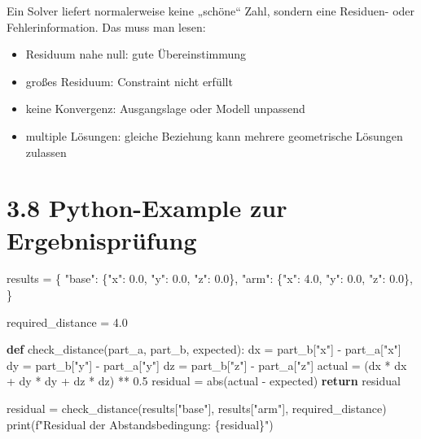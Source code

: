 \documentclass[
  12pt
]{book}
\newenvironment{Shaded}{}{}
\newcommand{\BuiltInTok}[1]{\textcolor[rgb]{0.00,0.50,0.00}{#1}}
\newcommand{\ControlFlowTok}[1]{\textcolor[rgb]{0.00,0.44,0.13}{\textbf{#1}}}
\newcommand{\FloatTok}[1]{\textcolor[rgb]{0.25,0.63,0.44}{#1}}
\newcommand{\KeywordTok}[1]{\textcolor[rgb]{0.00,0.44,0.13}{\textbf{#1}}}
\newcommand{\NormalTok}[1]{#1}
\newcommand{\OperatorTok}[1]{\textcolor[rgb]{0.40,0.40,0.40}{#1}}
\newcommand{\SpecialCharTok}[1]{\textcolor[rgb]{0.25,0.44,0.63}{#1}}
\newcommand{\SpecialStringTok}[1]{\textcolor[rgb]{0.73,0.40,0.53}{#1}}
\newcommand{\StringTok}[1]{\textcolor[rgb]{0.25,0.44,0.63}{#1}}
\providecommand{\tightlist}{%
  \setlength{\itemsep}{0pt}\setlength{\parskip}{0pt}}
\begin{document}
Ein Solver liefert normalerweise keine „schöne`` Zahl, sondern eine
Residuen- oder Fehlerinformation. Das muss man lesen:

\begin{itemize}
\tightlist
\item
  Residuum nahe null: gute Übereinstimmung
\item
  großes Residuum: Constraint nicht erfüllt
\item
  keine Konvergenz: Ausgangslage oder Modell unpassend
\item
  multiple Lösungen: gleiche Beziehung kann mehrere geometrische
  Lösungen zulassen
\end{itemize}

\hypertarget{python-example-zur-ergebnispruxfcfung}{%
\section{\texorpdfstring{{3.8} Python-Example zur
Ergebnisprüfung}{3.8 Python-Example zur Ergebnisprüfung}}\label{python-example-zur-ergebnispruxfcfung}}

\begin{Shaded}
\begin{Highlighting}[]
\NormalTok{results }\OperatorTok{=}\NormalTok{ \{}
    \StringTok{"base"}\NormalTok{: \{}\StringTok{"x"}\NormalTok{: }\FloatTok{0.0}\NormalTok{, }\StringTok{"y"}\NormalTok{: }\FloatTok{0.0}\NormalTok{, }\StringTok{"z"}\NormalTok{: }\FloatTok{0.0}\NormalTok{\},}
    \StringTok{"arm"}\NormalTok{: \{}\StringTok{"x"}\NormalTok{: }\FloatTok{4.0}\NormalTok{, }\StringTok{"y"}\NormalTok{: }\FloatTok{0.0}\NormalTok{, }\StringTok{"z"}\NormalTok{: }\FloatTok{0.0}\NormalTok{\},}
\NormalTok{\}}

\NormalTok{required\_distance }\OperatorTok{=} \FloatTok{4.0}

\KeywordTok{def}\NormalTok{ check\_distance(part\_a, part\_b, expected):}
\NormalTok{    dx }\OperatorTok{=}\NormalTok{ part\_b[}\StringTok{"x"}\NormalTok{] }\OperatorTok{{-}}\NormalTok{ part\_a[}\StringTok{"x"}\NormalTok{]}
\NormalTok{    dy }\OperatorTok{=}\NormalTok{ part\_b[}\StringTok{"y"}\NormalTok{] }\OperatorTok{{-}}\NormalTok{ part\_a[}\StringTok{"y"}\NormalTok{]}
\NormalTok{    dz }\OperatorTok{=}\NormalTok{ part\_b[}\StringTok{"z"}\NormalTok{] }\OperatorTok{{-}}\NormalTok{ part\_a[}\StringTok{"z"}\NormalTok{]}
\NormalTok{    actual }\OperatorTok{=}\NormalTok{ (dx }\OperatorTok{*}\NormalTok{ dx }\OperatorTok{+}\NormalTok{ dy }\OperatorTok{*}\NormalTok{ dy }\OperatorTok{+}\NormalTok{ dz }\OperatorTok{*}\NormalTok{ dz) }\OperatorTok{**} \FloatTok{0.5}
\NormalTok{    residual }\OperatorTok{=} \BuiltInTok{abs}\NormalTok{(actual }\OperatorTok{{-}}\NormalTok{ expected)}
    \ControlFlowTok{return}\NormalTok{ residual}

\NormalTok{residual }\OperatorTok{=}\NormalTok{ check\_distance(results[}\StringTok{"base"}\NormalTok{], results[}\StringTok{"arm"}\NormalTok{], required\_distance)}
\BuiltInTok{print}\NormalTok{(}\SpecialStringTok{f"Residual der Abstandsbedingung: }\SpecialCharTok{\{}\NormalTok{residual}\SpecialCharTok{\}}\SpecialStringTok{"}\NormalTok{)}
\end{Highlighting}
\end{Shaded}
\end{document}

